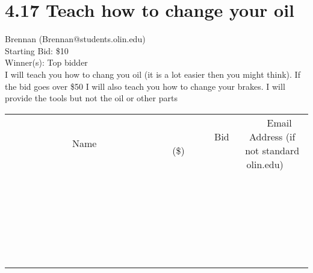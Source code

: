 \documentclass[11pt]{article}
\begin{document}
\section*{4.17 Teach how to change your oil}
Brennan  (Brennan@students.olin.edu) \\
Starting Bid: \$10 \\
Winner(s): 
Top bidder \\
I will teach you how to chang you oil (it is a lot easier then you might think). If the bid goes over \$50 I will also teach you how to change your brakes. I will provide the tools but not the oil or other parts \\[6ex]
\begin{tabular}{c c c}
~~~~~~~~~~~~~Name~~~~~~~~~~~~~ & ~~~~~~~~~Bid (\$)~~~~~~~~~ & ~~~Email Address (if not standard olin.edu)~~~ \\
 & & \\
\hline
 & & \\
\hline
 & & \\
\hline
 & & \\
\hline
 & & \\
\hline
 & & \\
\hline
 & & \\
\hline
 & & \\
\hline
 & & \\
\hline
 & & \\
\hline
 & & \\
\hline
 & & \\
\hline
 & & \\
\hline
 & & \\
\hline
 & & \\
\hline
 & & \\
\hline
 & & \\
\hline
 & & \\
\hline
 & & \\
\hline
 & & \\
\hline
 & & \\
\hline
 & & \\
\hline
 & & \\
\hline
 & & \\
\hline
 & & \\
\hline
 & & \\
\hline
\end{tabular}
\clearpage
\end{document}

